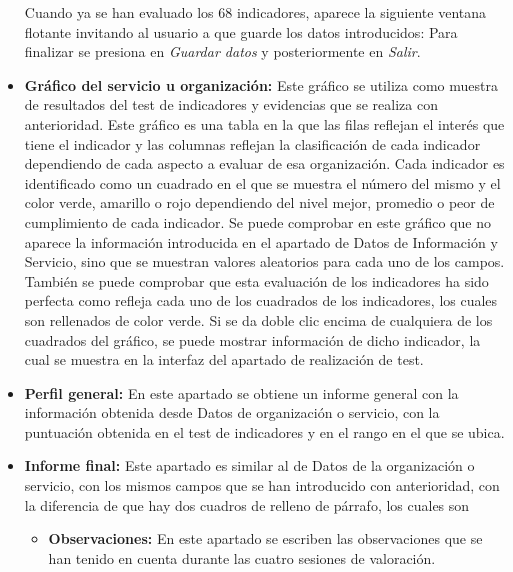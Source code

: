\begin{itemize}
        Cuando ya se han evaluado los 68 indicadores, aparece la siguiente ventana flotante invitando al usuario a que guarde los datos introducidos:
        Para finalizar se presiona en \textit{Guardar datos} y posteriormente en \textit{Salir}.
        \item \textbf{Gráfico del servicio u organización:} Este gráfico se utiliza como muestra de resultados del test de indicadores y evidencias que se realiza con anterioridad. 
        Este gráfico es una tabla en la que las filas reflejan el interés que tiene el indicador y las columnas reflejan la clasificación de cada indicador dependiendo de cada aspecto a 
        evaluar de esa organización. Cada indicador es identificado como un cuadrado en el que se muestra el número del mismo y el color verde, amarillo o rojo dependiendo del nivel mejor, 
        promedio o peor de cumplimiento de cada indicador.
        Se puede comprobar en este gráfico que no aparece la información introducida en el apartado de Datos de Información y Servicio, sino que se muestran valores aleatorios para cada uno de los campos.
        También se puede comprobar que esta evaluación de los indicadores ha sido perfecta como refleja cada uno de los cuadrados de los indicadores, los cuales son rellenados de color verde. Si se da doble clic encima 
        de cualquiera de los cuadrados del gráfico, se puede mostrar información de dicho indicador, la cual se muestra en la interfaz del apartado de realización de test.
        \item \textbf{Perfil general:} En este apartado se obtiene un informe general con la información obtenida desde Datos de organización o servicio, con la puntuación obtenida en el test de indicadores y en el rango en el que se ubica.
        \item \textbf{Informe final:} Este apartado es similar al de Datos de la organización o servicio, con los mismos campos que se han introducido con anterioridad, con la diferencia de que hay dos cuadros de relleno de párrafo, los cuales son 
        \begin{itemize}
            \item \textbf{Observaciones:} En este apartado se escriben las observaciones que se han tenido en cuenta durante las cuatro sesiones de valoración.

\end{itemize}
\end{itemize}
